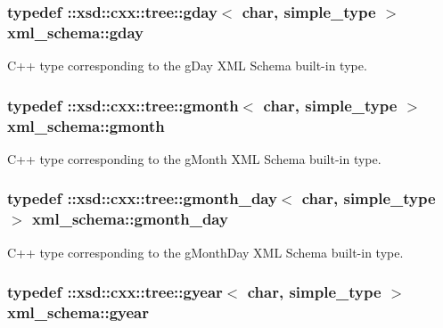 \subsubsection[{gday}]{\setlength{\rightskip}{0pt plus 5cm}typedef \+::xsd\+::cxx\+::tree\+::gday$<$ char, {\bf simple\+\_\+type} $>$ {\bf xml\+\_\+schema\+::gday}}\label{namespacexml__schema_a4beba84e7d1a15ea569cad2c7cc2247a}


C++ type corresponding to the g\+Day X\+M\+L Schema built-\/in type. 

\hypertarget{namespacexml__schema_a1ab06e26cf2c2f3ad971f63c143afd7f}{}
\subsubsection[{gmonth}]{\setlength{\rightskip}{0pt plus 5cm}typedef \+::xsd\+::cxx\+::tree\+::gmonth$<$ char, {\bf simple\+\_\+type} $>$ {\bf xml\+\_\+schema\+::gmonth}}\label{namespacexml__schema_a1ab06e26cf2c2f3ad971f63c143afd7f}


C++ type corresponding to the g\+Month X\+M\+L Schema built-\/in type. 

\hypertarget{namespacexml__schema_aa97adeeeffe50dd9b596b12006c56953}{}
\subsubsection[{gmonth\+\_\+day}]{\setlength{\rightskip}{0pt plus 5cm}typedef \+::xsd\+::cxx\+::tree\+::gmonth\+\_\+day$<$ char, {\bf simple\+\_\+type} $>$ {\bf xml\+\_\+schema\+::gmonth\+\_\+day}}\label{namespacexml__schema_aa97adeeeffe50dd9b596b12006c56953}


C++ type corresponding to the g\+Month\+Day X\+M\+L Schema built-\/in type. 

\hypertarget{namespacexml__schema_ab0d28a4409143544c8f43bbcc1edeac2}{}
\subsubsection[{gyear}]{\setlength{\rightskip}{0pt plus 5cm}typedef \+::xsd\+::cxx\+::tree\+::gyear$<$ char, {\bf simple\+\_\+type} $>$ {\bf xml\+\_\+schema\+::gyear}}\label{namespacexml__schema_ab0d28a4409143544c8f43bbcc1edeac2}


